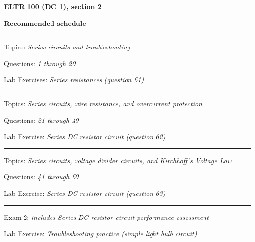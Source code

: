 \vfil \eject

\centerline{\bf ELTR 100 (DC 1), section 2} \bigskip 
 
\vskip 10pt

\noindent
{\bf Recommended schedule}

\vskip 5pt

\hrule \vskip 5pt
\noindent
{}

\hskip 10pt Topics: {\it Series circuits and troubleshooting}
 
\hskip 10pt Questions: {\it 1 through 20}
 
\hskip 10pt Lab Exercises: {\it Series resistances (question 61)}
 

\vskip 10pt
\hrule \vskip 5pt
\noindent
{}

\hskip 10pt Topics: {\it Series circuits, wire resistance, and overcurrent protection}
 
\hskip 10pt Questions: {\it 21 through 40}
 
\hskip 10pt Lab Exercise: {\it Series DC resistor circuit (question 62)}
 

\vskip 10pt
\hrule \vskip 5pt
\noindent
{}

\hskip 10pt Topics: {\it Series circuits, voltage divider circuits, and Kirchhoff's Voltage Law}
 
\hskip 10pt Questions: {\it 41 through 60}
 
\hskip 10pt Lab Exercise: {\it Series DC resistor circuit (question 63)}
 



\vskip 10pt
\hrule \vskip 5pt
\noindent
{}

\hskip 10pt Exam 2: {\it includes Series DC resistor circuit performance assessment}
 
\hskip 10pt Lab Exercise: {\it Troubleshooting practice (simple light bulb circuit)}
 
